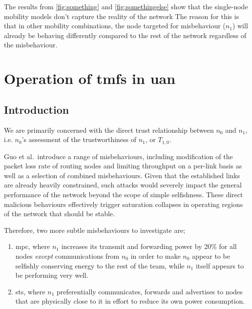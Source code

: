The results from \autoref{fig:something} and \autoref{fig:somethingelse} show that the single-node mobility models don't capture the reality of the network 
The reason for this is that in other mobility combinations, the node targeted for misbehaviour ($n_1$) will already be behaving differently compared to the rest of the network regardless of the misbehaviour.

\section{Operation of \glspl{tmf} in \gls{uan}}

\subsection{Introduction}


We are primarily concerned with the direct trust relationship between $n_0$ and $n_1$, i.e. $n_0$'s assessment of the trustworthiness of $n_1$, or $T_{1,0}$.

Guo et al.\ introduce a range of misbehaviours, including modification of the packet loss rate of routing nodes and limiting throughput on a per-link basis as well as a selection of combined misbehaviours. 
Given that the established links are already heavily constrained, such attacks would severely impact the general performance of the network beyond the scope of simple selfishness.
These direct malicious behaviours effectively trigger saturation collapses in operating regions of the network that should be stable.

Therefore, two more subtle misbehaviours to investigate are; 
\begin{enumerate}
	\item \acrfull{mpc}, where $n_1$ increases its transmit and forwarding power by 20\% for all nodes \emph{except} communications from $n_0$ in order to make $n_0$ appear to be selfishly conserving energy to the rest of the team, while $n_1$ itself appears to be performing very well.
	\item \acrfull{sts}, where $n_1$ preferentially communicates, forwards and advertises to nodes that are physically close to it in effort to reduce its own power consumption.
\end{enumerate}


